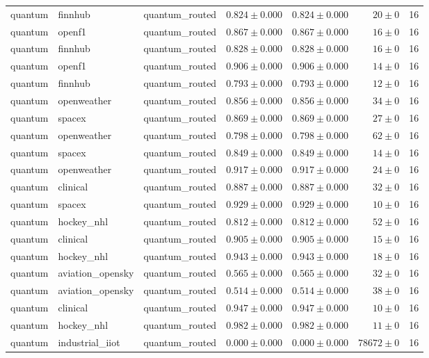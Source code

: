 \begin{table}[htbp]
\begin{tabular}{l l l r r r r}
quantum & finnhub & quantum\_routed & $0.824\pm0.000$ & $0.824\pm0.000$ & $20\pm0$ & 16 \\
quantum & openf1 & quantum\_routed & $0.867\pm0.000$ & $0.867\pm0.000$ & $16\pm0$ & 16 \\
quantum & finnhub & quantum\_routed & $0.828\pm0.000$ & $0.828\pm0.000$ & $16\pm0$ & 16 \\
quantum & openf1 & quantum\_routed & $0.906\pm0.000$ & $0.906\pm0.000$ & $14\pm0$ & 16 \\
quantum & finnhub & quantum\_routed & $0.793\pm0.000$ & $0.793\pm0.000$ & $12\pm0$ & 16 \\
quantum & openweather & quantum\_routed & $0.856\pm0.000$ & $0.856\pm0.000$ & $34\pm0$ & 16 \\
quantum & spacex & quantum\_routed & $0.869\pm0.000$ & $0.869\pm0.000$ & $27\pm0$ & 16 \\
quantum & openweather & quantum\_routed & $0.798\pm0.000$ & $0.798\pm0.000$ & $62\pm0$ & 16 \\
quantum & spacex & quantum\_routed & $0.849\pm0.000$ & $0.849\pm0.000$ & $14\pm0$ & 16 \\
quantum & openweather & quantum\_routed & $0.917\pm0.000$ & $0.917\pm0.000$ & $24\pm0$ & 16 \\
quantum & clinical & quantum\_routed & $0.887\pm0.000$ & $0.887\pm0.000$ & $32\pm0$ & 16 \\
quantum & spacex & quantum\_routed & $0.929\pm0.000$ & $0.929\pm0.000$ & $10\pm0$ & 16 \\
quantum & hockey\_nhl & quantum\_routed & $0.812\pm0.000$ & $0.812\pm0.000$ & $52\pm0$ & 16 \\
quantum & clinical & quantum\_routed & $0.905\pm0.000$ & $0.905\pm0.000$ & $15\pm0$ & 16 \\
quantum & hockey\_nhl & quantum\_routed & $0.943\pm0.000$ & $0.943\pm0.000$ & $18\pm0$ & 16 \\
quantum & aviation\_opensky & quantum\_routed & $0.565\pm0.000$ & $0.565\pm0.000$ & $32\pm0$ & 16 \\
quantum & aviation\_opensky & quantum\_routed & $0.514\pm0.000$ & $0.514\pm0.000$ & $38\pm0$ & 16 \\
quantum & clinical & quantum\_routed & $0.947\pm0.000$ & $0.947\pm0.000$ & $10\pm0$ & 16 \\
quantum & hockey\_nhl & quantum\_routed & $0.982\pm0.000$ & $0.982\pm0.000$ & $11\pm0$ & 16 \\
quantum & industrial\_iiot & quantum\_routed & $0.000\pm0.000$ & $0.000\pm0.000$ & $78672\pm0$ & 16 \\

\end{tabular}
\end{table}

